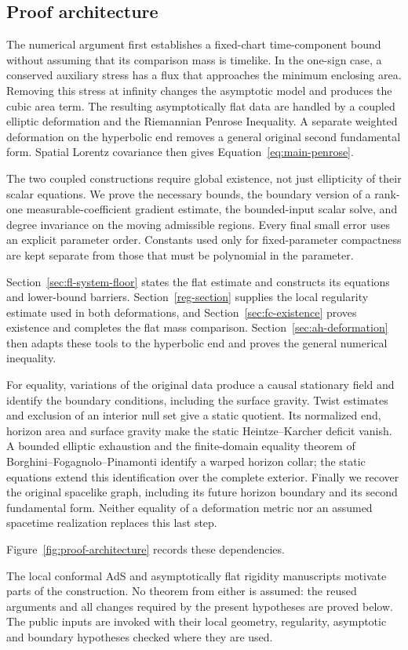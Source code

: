 \subsection{Proof architecture}
The numerical argument first establishes a fixed-chart time-component
bound without assuming that its comparison mass is timelike. In the
one-sign case, a conserved auxiliary stress has a flux that approaches
the minimum enclosing area. Removing this stress at infinity changes
the asymptotic model and produces the cubic area term. The resulting
asymptotically flat data are handled by a coupled elliptic deformation
and the Riemannian Penrose Inequality. A separate weighted deformation
on the hyperbolic end removes a general original second fundamental form.
Spatial Lorentz covariance then gives Equation~\ref{eq:main-penrose}.

The two coupled constructions require global existence, not just
ellipticity of their scalar equations. We prove the necessary bounds,
the boundary version of a rank-one measurable-coefficient gradient
estimate, the bounded-input scalar solve, and degree invariance on the
moving admissible regions. Every final small error uses an explicit
parameter order. Constants used only for fixed-parameter compactness
are kept separate from those that must be polynomial in the parameter.

Section~\ref{sec:fl-system-floor} states the flat estimate and constructs
its equations and lower-bound barriers. Section~\ref{reg-section}
supplies the local regularity estimate used in both deformations, and
Section~\ref{sec:fc-existence} proves existence and completes the flat
mass comparison. Section~\ref{sec:ah-deformation} then adapts these tools
to the hyperbolic end and proves the general numerical inequality.

For equality, variations of the original data produce a causal
stationary field and identify the boundary conditions, including the
surface gravity. Twist estimates and exclusion of an interior null set
give a static quotient. Its normalized end, horizon area and surface
gravity make the static Heintze--Karcher deficit vanish. A bounded
elliptic exhaustion and the finite-domain equality theorem of
Borghini--Fogagnolo--Pinamonti
\cite[Theorem~1.1]{borghinifogagnolopinamonti2024} identify a warped
horizon collar; the static equations extend this identification over
the complete exterior. Finally we recover the original
spacelike graph, including its future horizon boundary and its second
fundamental form. Neither equality of a deformation metric nor an
assumed spacetime realization replaces this last step.

Figure~\ref{fig:proof-architecture} records these dependencies.


The local conformal AdS and asymptotically flat rigidity manuscripts
\cite{internalads,internalflat} motivate parts of the construction.
No theorem from either is assumed: the reused arguments and all changes
required by the present hypotheses are proved below. The public inputs
are invoked with their local geometry, regularity, asymptotic and
boundary hypotheses checked where they are used.
